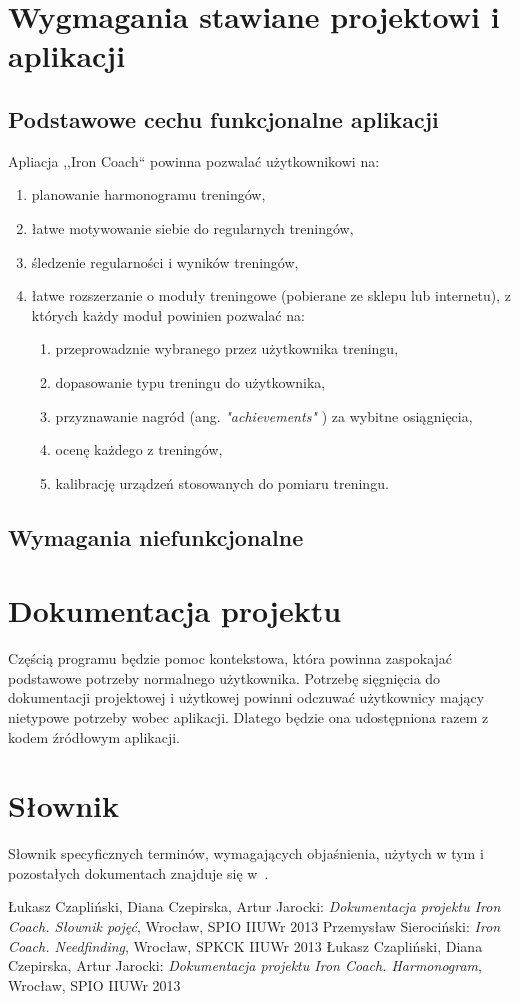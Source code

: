 \section{Wygmagania stawiane projektowi i aplikacji}
\subsection{Podstawowe cechu funkcjonalne aplikacji}
\noindent Apliacja ,,Iron Coach`` powinna pozwalać użytkownikowi na:
\begin{enumerate}
  \item planowanie harmonogramu treningów,
  \item łatwe motywowanie siebie do regularnych treningów,
  \item śledzenie regularności i wyników treningów,
  \item łatwe rozszerzanie o moduły treningowe (pobierane ze sklepu lub internetu), z których każdy moduł powinien pozwalać na:
    \begin{enumerate}
      \item przeprowadznie wybranego przez użytkownika treningu,
      \item dopasowanie typu treningu do użytkownika,
      \item przyznawanie nagród (ang. {\it "achievements"} \cite{Sł}) za wybitne osiągnięcia,
      \item ocenę każdego z treningów,
      \item kalibrację urządzeń stosowanych do pomiaru treningu.
    \end{enumerate}
\end{enumerate}
\label{pfunk}
\subsection{Wymagania niefunkcjonalne}
\section{Dokumentacja projektu}
\noindent Częścią programu będzie pomoc kontekstowa, która powinna zaspokajać podstawowe potrzeby normalnego użytkownika. Potrzebę sięgnięcia do dokumentacji projektowej i użytkowej powinni odczuwać użytkownicy mający nietypowe potrzeby wobec aplikacji. Dlatego będzie ona udostępniona razem z kodem źródłowym aplikacji.
\section{Słownik}
\noindent Słownik specyficznych terminów, wymagających objaśnienia, użytych w tym i pozostałych dokumentach znajduje się w~\cite{Sł}.
\begin{thebibliography}{99}
   Łukasz Czapliński, Diana Czepirska, Artur Jarocki: {\it Dokumentacja projektu Iron Coach. Słownik pojęć}, Wrocław, SPIO IIUWr 2013
   Przemysław Sierociński: {\it Iron Coach. Needfinding}, Wrocław, SPKCK IIUWr 2013
   Łukasz Czapliński, Diana Czepirska, Artur Jarocki: {\it Dokumentacja projektu Iron Coach. Harmonogram}, Wrocław, SPIO IIUWr 2013
\end{thebibliography}

